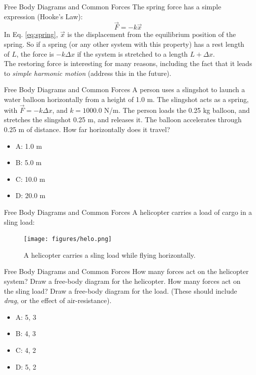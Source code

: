 \documentclass{beamer}
\begin{document}
\begin{frame}{Free Body Diagrams and Common Forces}
The spring force has a simple expression (Hooke's Law):
\begin{equation}
\vec{F} = -k\vec{x}
\label{eq:spring}
\end{equation}
In Eq. \ref{eq:spring}, $\vec{x}$ is the displacement from the equilibrium position of the spring.  So if a spring (or any other system with this property) has a rest length of $L$, the force is $-k\Delta x$ if the system is stretched to a length $L+\Delta x$. \\
\vspace{0.5cm}
The restoring force is interesting for many reasons, including the fact that it leads to \textit{simple harmonic motion} (address this in the future).
\end{frame}

\begin{frame}{Free Body Diagrams and Common Forces}
A person uses a slingshot to launch a water balloon horizontally from a height of 1.0 m.  The slingshot acts as a spring, with $\vec{F} = -k\Delta x$, and $k=1000.0$ N/m.  The person loads the 0.25 kg balloon, and stretches the slingshot 0.25 m, and releases it.  The balloon accelerates through 0.25 m of distance.  How far horizontally does it travel? 
\begin{itemize}
\item A: 1.0 m
\item B: 5.0 m
\item C: 10.0 m
\item D: 20.0 m
\end{itemize}
\end{frame}

\begin{frame}{Free Body Diagrams and Common Forces}
A helicopter carries a load of cargo in a sling load: \\
\begin{figure}
\centering
\texttt{[image: figures/helo.png]}
\caption{\label{fig:helo} A helicopter carries a sling load while flying horizontally.}
\end{figure}
\end{frame}

\begin{frame}{Free Body Diagrams and Common Forces}
How many forces act on the helicopter system?  Draw a free-body diagram for the helicopter.  How many forces act on the sling load?  Draw a free-body diagram for the load.  (These should include \textit{drag}, or the effect of air-resistance).
\begin{itemize}
\item A: 5, 3
\item B: 4, 3
\item C: 4, 2
\item D: 5, 2
\end{itemize}
\end{frame}
\end{document}
